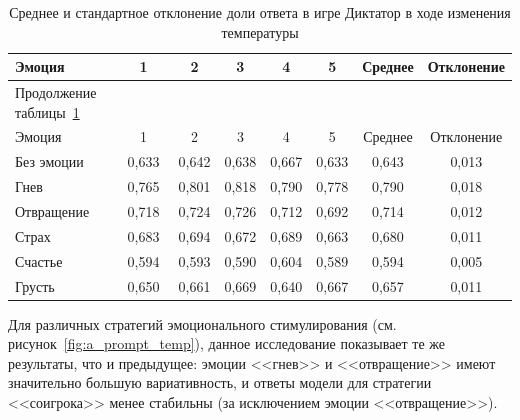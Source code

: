 \begin{small}
\begin{longtable}[c]{|p{4.6cm}|c|c|c|c|c|c|c|}
\caption{Среднее и стандартное отклонение доли ответа в игре Диктатор в ходе изменения температуры} \label{tab: a_mean_std_by_temp}
    \\
    \hline
Эмоция & 1 & 2 & 3 & 4  & 5 & Среднее & Отклонение \\ \hline
    \endfirsthead   
    \multicolumn{2}{l}{\hspace{-2mm}\normalsize{Продолжение таблицы~\ref{tab: a_mean_std_by_temp}}}        \\ %
\hline

Эмоция & 1 & 2 & 3 & 4  & 5 & Среднее & Отклонение \\ \hline \endhead        \hline %
    \endfoot        \hline
    \endlastfoot
Без эмоции & 0,633 & 0,642 & 0,638 & 0,667 & 0,633 & 0,643 & 0,013 \\
 \hline
Гнев     & 0,765 & 0,801 & 0,818 & 0,790 & 0,778 & 0,790 & 0,018 \\
 \hline
Отвращение & 0,718 & 0,724 & 0,726 & 0,712 & 0,692 & 0,714 & 0,012 \\
 \hline
Страх        & 0,683 & 0,694 & 0,672 & 0,689 & 0,663 & 0,680 & 0,011 \\
 \hline
Счастье & 0,594 & 0,593 & 0,590 & 0,604 & 0,589 & 0,594 & 0,005 \\
 \hline
Грусть & 0,650 & 0,661 & 0,669 & 0,640 & 0,667 & 0,657 & 0,011 \\
\hline
\end{longtable}
\end{small} 

Для различных стратегий эмоционального стимулирования (см. рисунок~\ref{fig:a_prompt_temp}), данное исследование показывает те же результаты, что и предыдущее: эмоции <<гнев>> и <<отвращение>> имеют значительно большую вариативность, и ответы модели для стратегии <<соигрока>> менее стабильны (за исключением эмоции <<отвращение>>).


\clearpage
    

